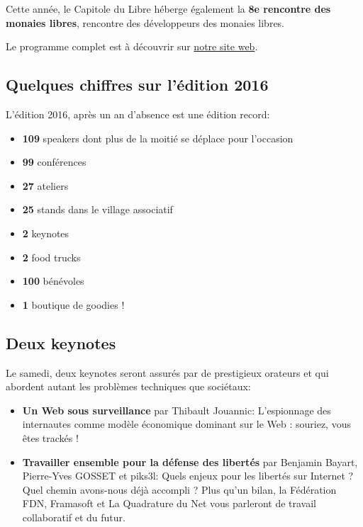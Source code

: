 Cette année, le Capitole du Libre héberge également la \textbf{8e rencontre des monaies libres}, rencontre des développeurs des monaies libres.

Le programme complet est à découvrir sur \href{https://2016.capitoledulibre.org/programme.html}{notre site web}.

\subsection{Quelques chiffres sur l'édition 2016}

L'édition 2016, après un an d'absence est une édition record:

\begin{itemize}[label=$\bullet$]
\item \textbf{109} speakers dont plus de la moitié se déplace pour l'occasion
\item \textbf{99} conférences
\item \textbf{27} ateliers
\item \textbf{25} stands dans le village associatif
\item \textbf{2} keynotes
\item \textbf{2} food trucks
\item \textbf{100} bénévoles
\item \textbf{1} boutique de goodies !
\end{itemize}

\subsection{Deux keynotes}

Le samedi, deux keynotes seront assurés par de prestigieux orateurs et qui abordent autant les problèmes techniques que sociétaux:

\begin{itemize}[label=$\bullet$]
\item \textbf{Un Web sous surveillance} par Thibault Jouannic: L'espionnage des internautes comme modèle économique dominant sur le Web : souriez, vous êtes trackés !
\item \textbf{Travailler ensemble pour la défense des libertés} par Benjamin Bayart, Pierre-Yves GOSSET et piks3l: Quels enjeux pour les libertés sur Internet ? Quel chemin avons-nous déjà accompli ? Plus qu'un bilan, la Fédération FDN, Framasoft et La Quadrature du Net vous parleront de travail collaboratif et du futur.
\end{itemize}

